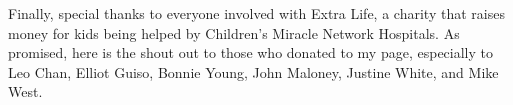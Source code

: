 \documentclass[hidelinks,pdflatex,final]{pittetd}
\begin{document}
Finally, special thanks to everyone involved with Extra Life, a charity that raises money for kids being helped by Children's Miracle Network Hospitals. As promised, here is the shout out to those who donated to my page, especially to Leo Chan, Elliot Guiso, Bonnie Young, John Maloney, Justine White, and Mike West.

%












%
\appendix


%
%
\end{document}
